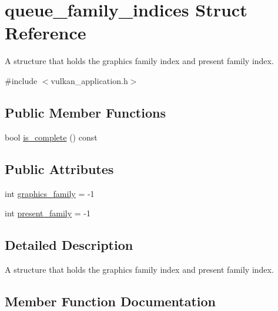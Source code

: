 \hypertarget{structqueue__family__indices}{}\section{queue\+\_\+family\+\_\+indices Struct Reference}
\label{structqueue__family__indices}


A structure that holds the graphics family index and present family index.  




{\ttfamily \#include $<$vulkan\+\_\+application.\+h$>$}

\subsection*{Public Member Functions}
\begin{DoxyCompactItemize}
\item 
bool \mbox{\hyperlink{structqueue__family__indices_a1f6182bcf604429eb48712951ba66fda}{is\+\_\+complete}} () const
\end{DoxyCompactItemize}
\subsection*{Public Attributes}
\begin{DoxyCompactItemize}
\item 
int \mbox{\hyperlink{structqueue__family__indices_a928da87763d74a6cba8a3d5b82355219}{graphics\+\_\+family}} = -\/1
\item 
int \mbox{\hyperlink{structqueue__family__indices_a208d926bd52d24f53ad5a8116e2f2d67}{present\+\_\+family}} = -\/1
\end{DoxyCompactItemize}


\subsection{Detailed Description}
A structure that holds the graphics family index and present family index. 

\subsection{Member Function Documentation}
\mbox{\label{structqueue__family__indices_a1f6182bcf604429eb48712951ba66fda}} 
